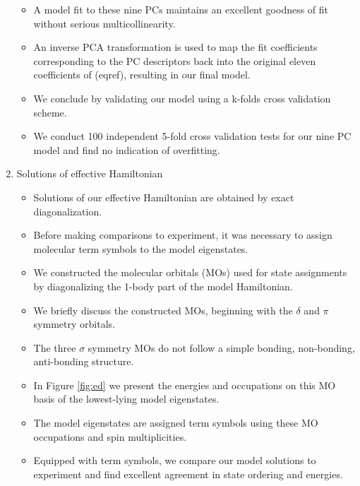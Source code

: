\documentclass{article}
\begin{document}
\begin{enumerate}
\begin{itemize}
\item {A model fit to these nine PCs maintains an excellent goodness of fit without serious multicollinearity.}

\item {An inverse PCA transformation is used to map the fit coefficients corresponding to the PC descriptors back into the original eleven coefficients of (eqref), resulting in our final model.}

\item {We conclude by validating our model using a k-folds cross validation scheme.}

\item {We conduct 100 independent 5-fold cross validation tests for our nine PC model and find no indication of overfitting.}
\end{itemize}

\item Solutions of effective Hamiltonian
\begin{itemize}
\item Solutions of our effective Hamiltonian are obtained by exact diagonalization.

\item Before making comparisons to experiment, it was necessary to assign molecular term symbols to the model eigenstates.

\item We constructed the molecular orbitals (MOs) used for state assignments by diagonalizing the 1-body part of the model Hamiltonian.

\item We briefly discuss the constructed MOs, beginning with the $\delta$ and $\pi$ symmetry orbitals.

\item The three $\sigma$ symmetry MOs do not follow a simple bonding, non-bonding, anti-bonding structure.

\item In Figure \ref{fig:ed} we present the energies and occupations on this MO basis of the lowest-lying model eigenstates.

\item The model eigenstates are assigned term symbols using these MO occupations and spin multiplicities.

\item Equipped with term symbols, we compare our model solutions to experiment and find excellent agreement in state ordering and energies.


\end{itemize}
\end{enumerate}
\end{document}
